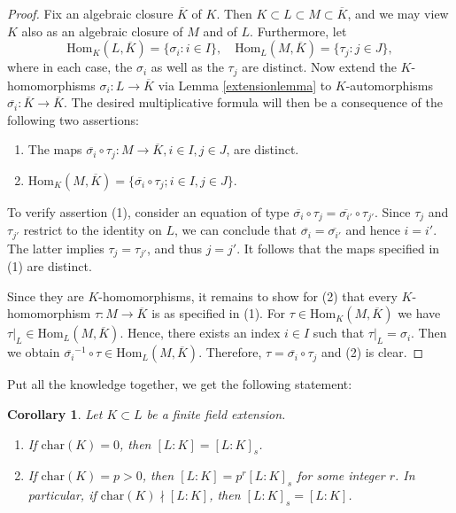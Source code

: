 \documentclass[12pt]{report}
\newtheorem{corollary}[theorem]{Corollary}
\theoremstyle{definition}
\newcommand{\charr}{\text{char}}
\newcommand{\Hom}{\text{Hom}}
\begin{document}
\begin{proof}
	Fix an algebraic closure $\overline{K}$ of $K$. Then $K \subset L \subset M \subset \overline{K}$, and we may view $K$ also as an algebraic closure of $M$ and of $L$. Furthermore, let
	$$\Hom_K(L,\overline{K}) = \{\sigma_i: i \in I\},\quad \Hom_L(M,\overline{K}) = \{\tau_j: j \in J\},$$ where in each case, the $\sigma_i$ as well as the $\tau_j$ are distinct. Now extend the $K$-homomorphisms $\sigma_i : L \to \overline{K}$ via Lemma \ref{extensionlemma} to $K$-automorphisms $\overline{\sigma_i}: \overline{K} \to \overline{K}$.
	The desired multiplicative formula will then be a consequence of the following two assertions:
	\begin{enumerate}
		\item The maps $\overline{\sigma_i} \circ \tau_j : M \to \overline{K}, i \in I, j \in J$, are distinct.
		\item $\Hom_K(M,\overline{K}) = \{\overline{\sigma_i} \circ \tau_j ; i \in I, j \in J\}.$
	\end{enumerate}

	To verify assertion (1), consider an equation of type $\overline{\sigma_i} \circ \tau_j = \overline{\sigma_{i'}} \circ \tau_{j'}$. Since $\tau_j$ and $\tau_{j'}$ restrict to the identity on $L$, we can conclude that $\overline{\sigma_i} = \overline{\sigma_{i'}}$ and hence $i = i'$. The latter implies $\tau_j = \tau_{j'}$, and thus $j = j'$. It follows that the maps specified in (1) are distinct.

	Since they are  $K$-homomorphisms, it remains to show for (2) that every $K$-homomorphism $\tau : M \to \overline{K}$ is as specified in (1). For $\tau \in \Hom_K(M,\overline{K})$ we have $\tau|_L \in \Hom_L(M,\overline{K})$. Hence, there exists an index $i \in I$ such that $\tau|_L = \sigma_i$. Then we obtain $\overline{\sigma_i}^{-1}\circ\tau \in \Hom_L(M,\overline{K})$. Therefore, $\tau=\overline{\sigma_i}\circ \tau_j$ and (2) is clear.
\end{proof}

Put all the knowledge together, we get the following statement:

\begin{corollary}
	Let $K \subset L$ be a finite field extension.
	\begin{enumerate}
		\item If $\charr(K) = 0$, then $[L : K] = [L : K]_s$.
		\item If $\charr(K) = p > 0$, then $[L : K] = p^r[L : K]_s$ for some integer $r$. In particular, if $\charr(K)\nmid [L:K]$, then $[L : K]_s = [L : K]$.
	\end{enumerate}
\end{corollary}
\end{document}
